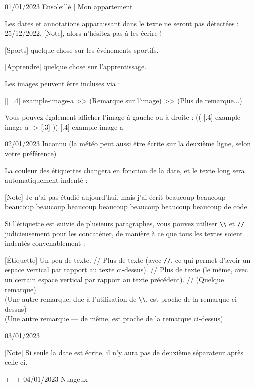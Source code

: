 \documentclass[11pt, paperstyle=light yellow, color entry, day-month-year]{jwjournal}
\begin{document}
01/01/2023 Ensoleillé | Mon appartement

  Les dates et annotations apparaissant dans le texte ne seront pas  détectées : 25/12/2022, [Note], alors n'hésitez pas à les écrire !

  [Sports] quelque chose sur les événements sportifs.

  [Apprendre] quelque chose sur l'apprentissage.

  Les images peuvent être incluses via :

  || [.4] {example-image-a}
  >> (Remarque sur l'image)
  >> (Plus de remarque...)

  Vous pouvez également afficher l'image à gauche ou à droite :
  (( [.4] {example-image-a}
  -> [.3] %
  )) [.4] {example-image-a}



02/01/2023
Inconnu (la météo peut aussi être écrite sur la deuxième ligne, selon votre préférence)

  La couleur des étiquettes changera en fonction de la date, et le texte long sera automatiquement indenté :

  [Note] Je n'ai pas étudié aujourd'hui, mais j'ai écrit beaucoup beaucoup beaucoup beaucoup beaucoup beaucoup beaucoup beaucoup beaucoup de code.

  Si l'étiquette est suivie de plusieurs paragraphes, vous pouvez utiliser \texttt{\textbackslash\textbackslash} et \texttt{\slash\slash} judicieusement pour les concaténer, de manière à ce que tous les textes soient indentés convenablement :

  [Étiquette] Un peu de texte.
    //
    Plus de texte (avec \texttt{\slash\slash}, ce qui permet d'avoir un espace vertical par rapport au texte ci-dessus).
    //
    Plus de texte (le même, avec un certain espace vertical par rapport au texte précédent).
    //
    (Quelque remarque)
    \\
    (Une autre remarque, due à l'utilisation de \texttt{\textbackslash\textbackslash}, est proche de la remarque ci-dessus)
    \\
    (Une autre remarque --- de même, est proche de la remarque ci-dessus)



03/01/2023

  [Note] Si seule la date est écrite, il n'y aura pas de deuxième séparateur après celle-ci.


+++
04/01/2023  Nuageux
\end{document}
